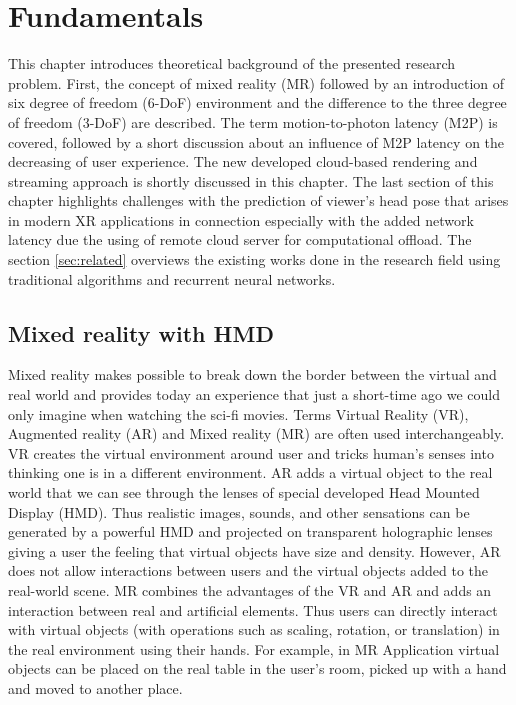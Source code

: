 
\chapter{Fundamentals}
\label{sec:theorie}
This chapter introduces theoretical background of the presented research problem. First, the concept of mixed reality (MR) followed by an introduction of six degree of freedom (6-DoF) environment and the difference to the three degree of freedom (3-DoF) are described. The term motion-to-photon latency (M2P) is covered, followed by a short discussion about an influence of M2P latency on the decreasing of user experience. The new developed cloud-based rendering and streaming approach is shortly discussed in this chapter. The last section of this chapter highlights challenges with the prediction of viewer's head pose that arises in modern XR applications in connection especially with the added network latency due the using of remote cloud server for computational offload. The section \ref{sec:related} overviews the existing works done in the research field using traditional algorithms and recurrent neural networks. 
\section{Mixed reality with HMD}
\label{sec:theorie:ar}
Mixed reality makes possible to break down the border between the virtual and real world and provides today an experience that just a short-time ago we could only imagine when watching the sci-fi movies. Terms Virtual Reality (VR), Augmented reality (AR) and Mixed reality (MR) are often used interchangeably. VR creates the virtual environment around user and tricks human's senses into thinking one is in a different environment. AR adds a virtual object to the real world that we can see through the lenses of special developed Head Mounted Display (HMD). Thus realistic images, sounds, and other sensations can be generated by a powerful HMD and projected on transparent holographic lenses giving a user the feeling that virtual objects have size and density. However, AR does not allow interactions between users and the virtual objects added to the real-world scene. MR combines the advantages of the VR and AR and adds an interaction between real and artificial elements. Thus users can directly interact with virtual objects (with operations such as scaling, rotation, or translation) in the real environment using their hands. For example, in MR Application virtual objects can be placed on the real table in the user's room, picked up with a hand and moved to another place.

